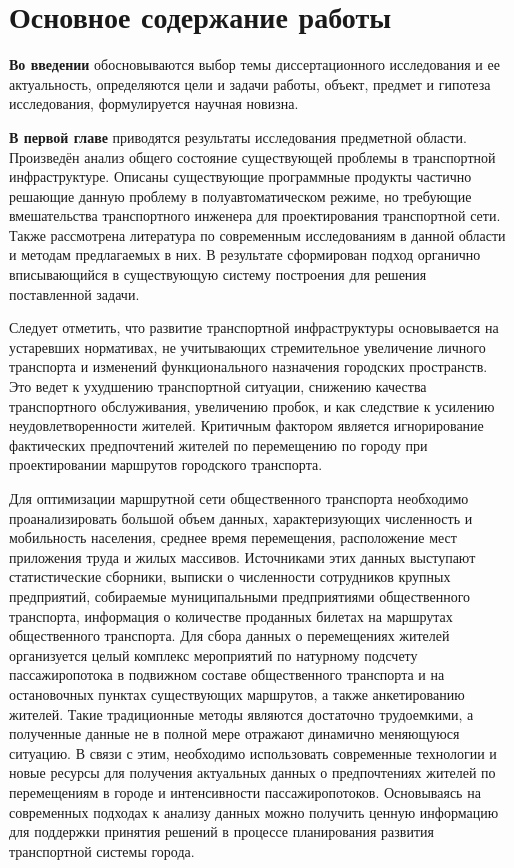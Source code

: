 \section{Основное содержание работы}
\textbf{Во введении} обосновываются выбор темы диссертационного исследования и ее актуальность, определяются 
цели и задачи работы, объект, предмет и гипотеза исследования, формулируется научная новизна.

\textbf{В первой главе} приводятся результаты исследования предметной области. Произведён анализ общего 
состояние существующей проблемы в транспортной инфраструктуре. Описаны существующие программные продукты 
частично решающие данную проблему в полуавтоматическом режиме, но требующие вмешательства транспортного 
инженера для проектирования транспортной сети. Также рассмотрена литература по современным исследованиям в 
данной области и методам предлагаемых в них. В результате сформирован подход органично вписывающийся в 
существующую систему построения для решения поставленной задачи.

Следует отметить, что развитие транспортной инфраструктуры основывается на устаревших нормативах, не 
учитывающих стремительное увеличение личного транспорта и изменений функционального назначения городских 
пространств. Это ведет к ухудшению транспортной ситуации, снижению качества транспортного обслуживания, 
увеличению пробок, и как следствие к усилению неудовлетворенности жителей. Критичным фактором является 
игнорирование фактических предпочтений жителей по перемещению по городу при проектировании маршрутов 
городского транспорта.

Для оптимизации маршрутной сети общественного транспорта необходимо проанализировать большой объем данных, 
характеризующих численность и мобильность населения, среднее время перемещения, расположение мест приложения 
труда и жилых массивов. Источниками этих данных выступают статистические сборники, выписки о численности 
сотрудников крупных предприятий, собираемые муниципальными предприятиями общественного транспорта, 
информация о количестве проданных билетах на маршрутах общественного транспорта. Для сбора данных о 
перемещениях жителей организуется целый комплекс мероприятий по натурному подсчету пассажиропотока в 
подвижном составе общественного транспорта и на остановочных пунктах существующих маршрутов, а также 
анкетированию жителей. Такие традиционные методы являются достаточно трудоемкими, а полученные данные не в 
полной мере отражают динамично меняющуюся ситуацию. В связи с этим, необходимо использовать современные 
технологии и новые ресурсы для получения актуальных данных о предпочтениях жителей по перемещениям в городе 
и интенсивности пассажиропотоков. Основываясь на современных подходах к анализу данных можно получить 
ценную информацию для поддержки принятия решений в процессе планирования развития транспортной системы 
города.

